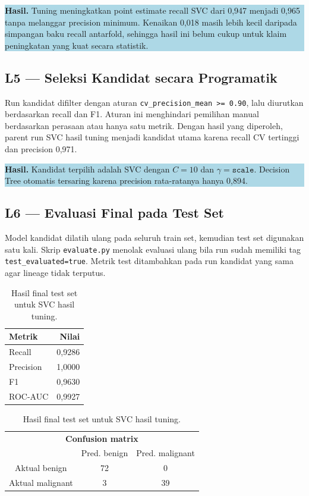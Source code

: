 \documentclass[11pt,a4paper]{article}
\newcommand{\resultbox}[1]{%
  \begin{center}
    \colorbox{lightblue}{\parbox{0.91\linewidth}{\textbf{Hasil.} #1}}
  \end{center}
}
\begin{document}
\resultbox{Tuning meningkatkan point estimate recall SVC dari 0,947 menjadi 0,965 tanpa melanggar precision minimum. Kenaikan 0,018 masih lebih kecil daripada simpangan baku recall antarfold, sehingga hasil ini belum cukup untuk klaim peningkatan yang kuat secara statistik.}

\subsection{L5 --- Seleksi Kandidat secara Programatik}

Run kandidat difilter dengan aturan \texttt{cv\_precision\_mean >= 0.90}, lalu diurutkan berdasarkan recall dan F1. Aturan ini menghindari pemilihan manual berdasarkan perasaan atau hanya satu metrik. Dengan hasil yang diperoleh, parent run SVC hasil tuning menjadi kandidat utama karena recall CV tertinggi dan precision 0,971.

\resultbox{Kandidat terpilih adalah SVC dengan $C=10$ dan $\gamma=\texttt{scale}$. Decision Tree otomatis tersaring karena precision rata-ratanya hanya 0,894.}

\subsection{L6 --- Evaluasi Final pada Test Set}

Model kandidat dilatih ulang pada seluruh train set, kemudian test set digunakan satu kali. Skrip \texttt{evaluate.py} menolak evaluasi ulang bila run sudah memiliki tag \texttt{test\_evaluated=true}. Metrik test ditambahkan pada run kandidat yang sama agar lineage tidak terputus.

\begin{table}[ht]
\centering
\caption{Hasil final test set untuk SVC hasil tuning.}
\begin{tabular}{lr}
\toprule
Metrik & Nilai \\
\midrule
Recall & 0,9286 \\
Precision & 1,0000 \\
F1 & 0,9630 \\
ROC-AUC & 0,9927 \\
\bottomrule
\end{tabular}
\hspace{1.5cm}
\begin{tabular}{c|cc}
\multicolumn{3}{c}{\textbf{Confusion matrix}} \\
 & Pred. benign & Pred. malignant \\
\hline
Aktual benign & 72 & 0 \\
Aktual malignant & 3 & 39 \\
\end{tabular}
\end{table}
\end{document}
